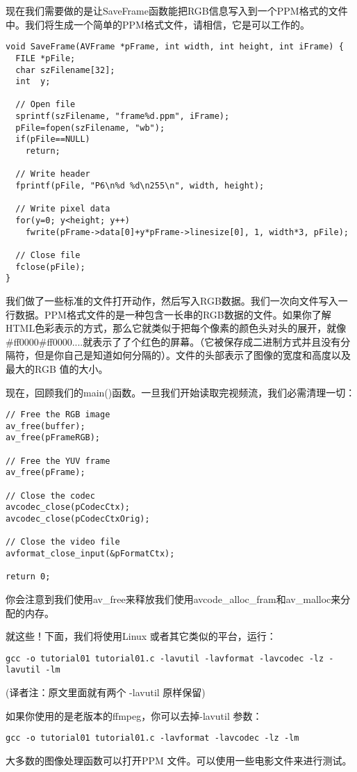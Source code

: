 现在我们需要做的是让SaveFrame函数能把RGB信息写入到一个PPM格式的文件中。我们将生成一个简单的PPM格式文件，请相信，它是可以工作的。

\begin{lstlisting}
void SaveFrame(AVFrame *pFrame, int width, int height, int iFrame) {
  FILE *pFile;
  char szFilename[32];
  int  y;

  // Open file
  sprintf(szFilename, "frame%d.ppm", iFrame);
  pFile=fopen(szFilename, "wb");
  if(pFile==NULL)
    return;

  // Write header
  fprintf(pFile, "P6\n%d %d\n255\n", width, height);

  // Write pixel data
  for(y=0; y<height; y++)
    fwrite(pFrame->data[0]+y*pFrame->linesize[0], 1, width*3, pFile);

  // Close file
  fclose(pFile);
}
\end{lstlisting}

我们做了一些标准的文件打开动作，然后写入RGB数据。我们一次向文件写入一行数据。PPM格式文件的是一种包含一长串的RGB数据的文件。如果你了解HTML色彩表示的方式，那么它就类似于把每个像素的颜色头对头的展开，就像\#ff0000\#ff0000....就表示了了个红色的屏幕。（它被保存成二进制方式并且没有分隔符，但是你自己是知道如何分隔的）。文件的头部表示了图像的宽度和高度以及最大的RGB 值的大小。

现在，回顾我们的main()函数。一旦我们开始读取完视频流，我们必需清理一切：
\begin{lstlisting}
// Free the RGB image
av_free(buffer);
av_free(pFrameRGB);

// Free the YUV frame
av_free(pFrame);

// Close the codec
avcodec_close(pCodecCtx);
avcodec_close(pCodecCtxOrig);

// Close the video file
avformat_close_input(&pFormatCtx);

return 0;
\end{lstlisting}

你会注意到我们使用av_free来释放我们使用avcode_alloc_fram和av_malloc来分配的内存。

就这些！下面，我们将使用Linux 或者其它类似的平台，运行：
\begin{lstlisting}
gcc -o tutorial01 tutorial01.c -lavutil -lavformat -lavcodec -lz -lavutil -lm
\end{lstlisting}
(译者注：原文里面就有两个 -lavutil 原样保留)

如果你使用的是老版本的ffmpeg，你可以去掉-lavutil 参数：
\begin{lstlisting}
gcc -o tutorial01 tutorial01.c -lavformat -lavcodec -lz -lm
\end{lstlisting}

大多数的图像处理函数可以打开PPM 文件。可以使用一些电影文件来进行测试。
